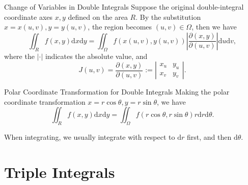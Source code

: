 \begin{proposition}{Change of Variables in Double Integrals}{}
  Suppose the original double-integral coordinate axes $x, y$ defined on the
  area $R$.
  By the substitution $x = x(u, v), y = y(u, v)$, the region becomes $(u, v) \in
  \Omega$, then we have
  \begin{equation}
    \iint_Rf(x,y)\mathrm{d}x\mathrm{d}y=\iint_\Omega f(x(u,v),y(u,v))\left|\frac{\partial(x,y)}{\partial(u,v)}\right|\mathrm{d}u\mathrm{d}v,
  \end{equation}
  where the $|\cdot|$ indicates the absolute value, and
  \begin{equation}
    J(u,v) = \frac{\partial (x, y)}{\partial (u, v)} := \left|
      \begin{array}{cc}
        x_u&y_u\\
        x_v&y_v
      \end{array}
    \right|.
  \end{equation}
\end{proposition}

\begin{proposition}{Polar Coordinate Transformation for Double Integrals}{}
  Making the polar coordinate transformation $x = r\cos\theta, y = r \sin
  \theta$,
  we have
  \begin{equation}
    \iint_R f(x, y)\mathrm{d} x \mathrm{d} y = \iint_{\Omega}f(r \cos \theta, r \sin \theta) r \mathrm{d} r \mathrm{d} \theta.
  \end{equation}
\end{proposition}

\begin{note}
  When integrating, we usually integrate with respect to $\mathrm{d} r$ first,
  and then $\mathrm{d} \theta$.
\end{note}


\section{Triple Integrals}








